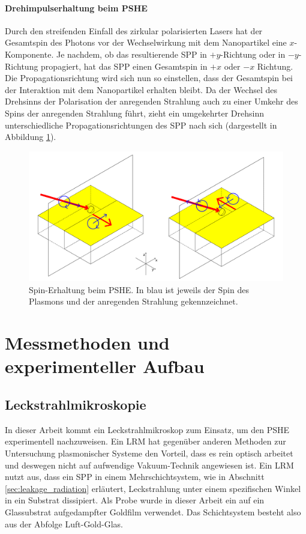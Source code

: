 \documentclass[titlepage,  ngerman]{article}
\begin{document}
	\paragraph{Drehimpulserhaltung beim PSHE}
	Durch den streifenden Einfall des zirkular polarisierten Lasers hat der Gesamtspin des Photons vor der Wechselwirkung mit dem Nanopartikel eine $x$-Komponente. Je nachdem, ob das resultierende SPP in $+y$-Richtung oder in $-y$-Richtung propagiert, hat das SPP einen Gesamtspin in  $+x$ oder $-x$ Richtung. Die Propagationsrichtung wird sich nun so einstellen, dass der Gesamtspin bei der Interaktion mit dem Nanopartikel erhalten bleibt. Da der Wechsel des Drehsinns der Polarisation der anregenden Strahlung auch zu einer Umkehr des Spins der anregenden Strahlung führt, zieht ein umgekehrter Drehsinn unterschiedliche Propagationsrichtungen des SPP nach sich (dargestellt in Abbildung \ref{fig:spin_hall_schema}).
	\begin{figure}[h]
		\centering
		\includegraphics[width=1.0\linewidth]{figures/spin_hall_schema.pdf}
		\caption[Spin-Erhaltung PSHE]{Spin-Erhaltung beim PSHE. In blau ist jeweils der Spin des Plasmons und der anregenden Strahlung gekennzeichnet.}
		\label{fig:spin_hall_schema}
	\end{figure}
	
	
	
	\section{Messmethoden und experimenteller Aufbau}
	\subsection{Leckstrahlmikroskopie}
	In dieser Arbeit kommt ein Leckstrahlmikroskop zum Einsatz, um den PSHE experimentell nachzuweisen. Ein LRM hat gegenüber anderen Methoden zur Untersuchung plasmonischer Systeme den Vorteil, dass es rein optisch arbeitet und deswegen nicht auf aufwendige Vakuum-Technik angewiesen ist. Ein LRM nutzt aus, dass ein SPP in einem Mehrschichtsystem, wie in Abschnitt \ref{sec:leakage_radiation} erläutert, Leckstrahlung unter einem spezifischen Winkel in ein Substrat dissipiert. Als Probe wurde in dieser Arbeit ein auf ein Glassubstrat aufgedampfter Goldfilm verwendet. Das Schichtsystem besteht also aus der Abfolge Luft-Gold-Glas.
	
\end{document}
